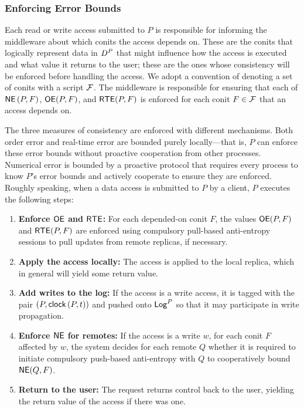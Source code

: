 \documentclass[]             %
{NASA}                       %
\theoremstyle{definition}
\begin{document}
\subsubsection{Enforcing Error Bounds}
\label{sssec:conit-tuning-bounds}
Each read or write access submitted to $P$ is responsible for
informing the middleware about which conits the access depends
on. These are the conits that logically represent data in $D^{P}$ that
might influence how the access is executed and what value it returns
to the user; these are the ones whose consistency will be enforced
before handling the access. We adopt a convention of denoting a set of
conits with a script $\mathcal{F}$. The middleware is responsible for
ensuring that each of $\mathsf{NE} \left(P, F\right)$, $\mathsf{OE}(P, F)$, and
$\mathsf{RTE}(P, F)$ is enforced for each conit $F \in \mathcal{F}$ that an access
depends on.

The three measures of consistency are enforced with different
mechanisms. Both order error and real-time error are bounded purely
locally---that is, $P$ can enforce these error bounds without
proactive cooperation from other processes. Numerical error is bounded
by a proactive protocol that requires every process to know $P$'s
error bounds and actively cooperate to ensure they are enforced.
Roughly speaking, when a data access is submitted to $P$ by a client,
$P$ executes the following steps:
\begin{enumerate}
\item \textbf{Enforce $\mathsf{OE}$ and $\mathsf{RTE}$:} For each depended-on conit
  $F$, the values $\mathsf{OE}(P, F)$ and $\mathsf{RTE}(P, F)$ are enforced using
  compulsory pull-based anti-entropy sessions to pull updates from
  remote replicas, if necessary.
\item \textbf{Apply the access locally:} The access is applied to the
  local replica, which in general will yield some return value.
\item \textbf{Add writes to the log:} If the access is a write access,
  it is tagged with the pair $(P, \mathsf{clock}\left(P,t\right))$ and pushed onto $\mathsf{Log}^{P}$ so
  that it may participate in write propagation.
\item \textbf{Enforce $\mathsf{NE}$ for remotes:} If the access is a write
  $w$, for each conit $F$ affected by $w$, the system decides for each
  remote $Q$ whether it is required to initiate compulsory push-based
  anti-entropy with $Q$ to cooperatively bound $\mathsf{NE}(Q, F)$.
\item \textbf{Return to the user:} The request returns control back to
  the user, yielding the return value of the access if there was one.
\end{enumerate}
\end{document}
